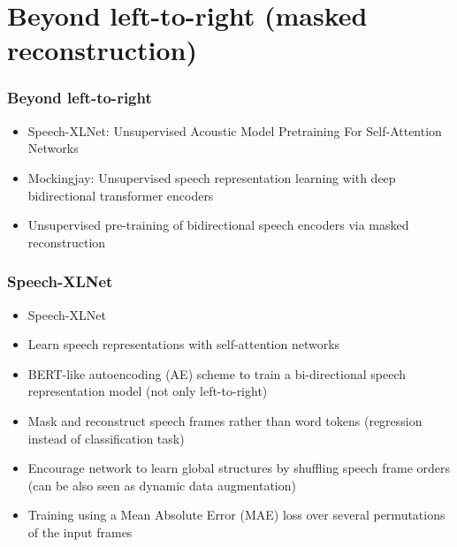 \documentclass[table]{beamer}
\begin{document}
\section{Beyond left-to-right (masked reconstruction)}

\begin{frame}
\frametitle{Beyond left-to-right}

		\begin{itemize}
			\item Speech-XLNet: Unsupervised Acoustic Model Pretraining For Self-Attention Networks \citep{song2019speechxlnet}
			\item Mockingjay: Unsupervised speech representation learning with deep bidirectional transformer encoders \citep{Liu_2020}
			\item Unsupervised pre-training of bidirectional speech encoders via masked reconstruction \citep{wang2020unsupervised}
		\end{itemize} 



\end{frame}


\begin{frame}
\frametitle{Speech-XLNet }

		\begin{itemize}
			\item Speech-XLNet \citep{song2019speechxlnet}
			\item Learn speech representations with self-attention networks 
			\item BERT-like autoencoding (AE) scheme to train a bi-directional speech representation model (not only left-to-right)
			\item Mask and reconstruct speech frames rather than word tokens (regression instead of classification task)
			\item Encourage network to learn global structures by shuffling speech frame orders (can be also seen as dynamic data augmentation)
			\item Training using a Mean Absolute Error (MAE) loss over several permutations of the input frames
		\end{itemize} 
\end{frame}
\end{document}
